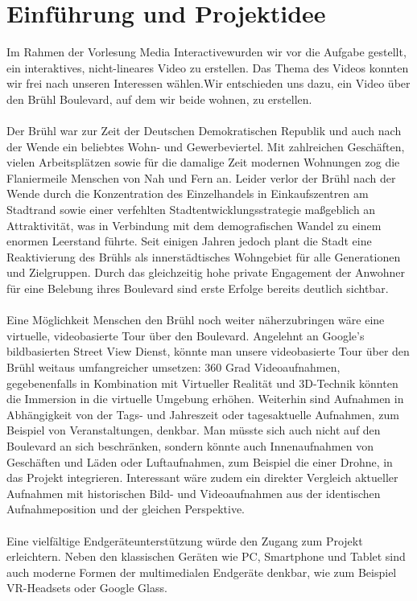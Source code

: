 \chapter{Einführung und Projektidee}
Im Rahmen der Vorlesung \glqq Media Interactive\grqq wurden wir vor die Aufgabe gestellt, ein interaktives, nicht-lineares Video zu erstellen. Das Thema des Videos konnten wir frei nach unseren Interessen wählen.Wir entschieden uns dazu, ein Video über den Brühl Boulevard, auf dem wir beide wohnen, zu erstellen.
\\ \\
Der Brühl war zur Zeit der Deutschen Demokratischen Republik und auch nach der Wende ein beliebtes Wohn- und Gewerbeviertel. Mit zahlreichen Geschäften, vielen Arbeitsplätzen sowie für die damalige Zeit modernen Wohnungen zog die Flaniermeile Menschen von Nah und Fern an. Leider verlor der Brühl nach der Wende durch die Konzentration des Einzelhandels in Einkaufszentren am Stadtrand sowie einer verfehlten Stadtentwicklungsstrategie maßgeblich an Attraktivität, was in Verbindung mit dem demografischen Wandel zu einem enormen Leerstand führte. Seit einigen Jahren jedoch plant die Stadt eine Reaktivierung des Brühls als innerstädtisches Wohngebiet für alle Generationen und Zielgruppen. Durch das gleichzeitig hohe private Engagement der Anwohner für eine Belebung ihres Boulevard sind erste Erfolge bereits deutlich sichtbar.
\\ \\
Eine Möglichkeit Menschen den Brühl noch weiter näherzubringen wäre eine virtuelle, videobasierte Tour über den Boulevard. Angelehnt an Google's bildbasierten Street View Dienst, könnte man unsere videobasierte Tour über den Brühl weitaus umfangreicher umsetzen: 360 Grad Videoaufnahmen, gegebenenfalls in Kombination mit Virtueller Realität und 3D-Technik könnten die Immersion in die virtuelle Umgebung erhöhen. Weiterhin sind Aufnahmen in Abhängigkeit von der Tags- und Jahreszeit oder tagesaktuelle Aufnahmen, zum Beispiel von Veranstaltungen, denkbar. Man müsste sich auch nicht auf den Boulevard an sich beschränken, sondern könnte auch Innenaufnahmen von Geschäften und Läden oder Luftaufnahmen, zum Beispiel die einer Drohne, in das Projekt integrieren. Interessant wäre zudem ein direkter Vergleich aktueller Aufnahmen mit historischen Bild- und Videoaufnahmen aus der identischen Aufnahmeposition und der gleichen Perspektive.
\\ \\
Eine vielfältige Endgeräteunterstützung würde den Zugang zum Projekt erleichtern. Neben den klassischen Geräten wie PC, Smartphone und Tablet sind auch moderne Formen der multimedialen Endgeräte denkbar, wie zum Beispiel VR-Headsets oder Google Glass.



